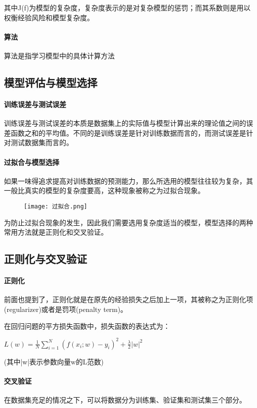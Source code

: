 \documentclass[UTF8]{ctexart}
\begin{document}
	其中J(f)为模型的复杂度，复杂度表示的是对复杂模型的惩罚；而其系数则是用以权衡经验风险和模型复杂度。

	\paragraph{算法}
	算法是指学习模型中的具体计算方法

	\subsection{模型评估与模型选择}
	\paragraph{训练误差与测试误差}
	训练误差与测试误差的本质是数据集上的实际值与模型计算出来的理论值之间的误差函数之和的平均值。不同的是训练误差是针对训练数据而言的，而测试误差是针对测试数据集而言的。

	\paragraph{过拟合与模型选择}
	如果一味得追求提高对训练数据的预测能力，那么所选用的模型往往较为复杂，其一般比真实的模型的复杂度要高，这种现象被称之为过拟合现象。

	\begin{figure}[!htb]
	\centering
	\texttt{[image: 过拟合.png]}
	\end{figure}

	为防止过拟合现象的发生，因此我们需要选用复杂度适当的模型，模型选择的两种常用方法就是正则化和交叉验证。

	\subsection{正则化与交叉验证}
	\paragraph{正则化} 前面也提到了，正则化就是在原先的经验损失之后加上一项，其被称之为正则化项(regularizer)或者是罚项(penalty term)。

	在回归问题的平方损失函数中，损失函数的表达式为：

	$L(w)=\frac{1}{N}\sum^{N}_{i=1}(f(x_i;w)-y_i)^2+\frac{\lambda}{2}|w|^2$

	(其中|w|表示参数向量w的L范数)

	\paragraph{交叉验证}
	在数据集充足的情况之下，可以将数据分为训练集、验证集和测试集三个部分。
\end{document}
